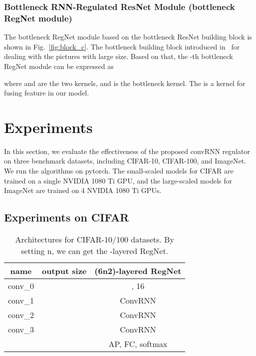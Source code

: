 \documentclass[journal,comsoc]{IEEEtran}
\begin{document}
\subsubsection{Bottleneck RNN-Regulated ResNet Module (bottleneck RegNet module)}

The bottleneck RegNet module based on the bottleneck ResNet building block is shown in Fig.~\ref{fig:block_c}. The bottleneck building block introduced in~\cite{DBLP:journals/corr/HeZRS15} for dealing with the pictures with large size.
Based on that, the -th bottleneck RegNet module can be expressed as

where  and  are the two  kernels, and  is the  bottleneck kernel. The  is a  kernel for fusing feature in our model.

\section{Experiments}
In this section, we evaluate the effectiveness of the proposed convRNN regulator on three benchmark datasets, including CIFAR-10, CIFAR-100, and ImageNet. We run the algorithms on pytorch. The small-scaled models for CIFAR  are trained on a single NVIDIA 1080 Ti GPU, and the large-scaled models for ImageNet are trained on 4 NVIDIA 1080 Ti GPUs. 


\subsection{Experiments on CIFAR}

\begin{table}
\caption{Architectures for CIFAR-10/100 datasets. By setting n, we can get the -layered RegNet.}
\begin{center}
\begin{tabular}{c|c|c}
\hline
name     & output size & (6n2)-layered RegNet \\
\hline \hline
conv\_0  &  & , 16 \\
\hline
conv\_1 &  &  ConvRNN   \\
\hline
conv\_2 &  &  ConvRNN   \\
\hline
conv\_3 &  &   ConvRNN  \\
\hline
               &  & AP, FC, softmax  \\
\hline
\end{tabular}
\end{center}
\label{table:cifar_structual}
\end{table}
\end{document}
